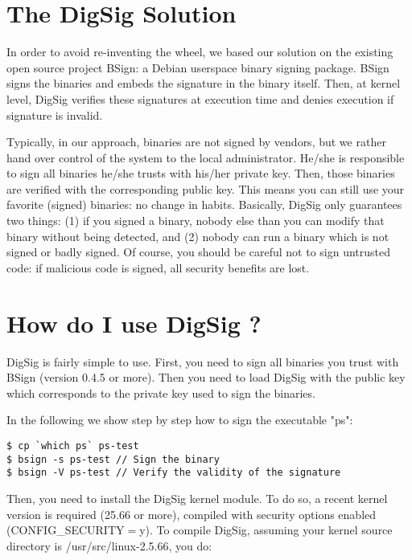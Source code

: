 \documentclass{article}
\begin{document}

\section{The DigSig Solution}

In order to avoid re-inventing the wheel, we based our solution on the
existing open source project BSign: a Debian userspace binary
signing package. BSign signs the binaries and embeds the signature in
the binary itself. Then, at kernel level, DigSig verifies these 
signatures at execution time and denies execution if signature is invalid. 

Typically, in our approach, binaries are not signed by vendors, but we
rather hand over control of the system to the local administrator.
He/she is responsible to sign all binaries he/she trusts with his/her
private key. Then, those binaries are verified with the corresponding
public key. This means you can still use your favorite (signed)
binaries: no change in habits. Basically, DigSig only guarantees two
things: (1) if you signed a binary, nobody else than you can modify
that binary without being detected, and (2) nobody can run a binary
which is not signed or badly signed.  Of course, you should be careful
not to sign untrusted code: if malicious code is signed, all security
benefits are lost.

\section{How do I use DigSig ?}
DigSig is fairly simple to use. First, you need to sign all binaries
you trust with BSign (version 0.4.5 or more). Then you need to load
DigSig with the public key which corresponds to the private key
used to sign the binaries.

In the following we show step by step how to sign the executable "ps":

\begin{verbatim} 
$ cp `which ps` ps-test
$ bsign -s ps-test // Sign the binary
$ bsign -V ps-test // Verify the validity of the signature 
\end{verbatim} 

Then, you need to install the DigSig kernel module. To do so, a recent
kernel version is required (25.66 or more), compiled with security
options enabled (CONFIG\_SECURITY$=$y).  To compile DigSig, assuming your
kernel source directory is /usr/src/linux-2.5.66, you do:
\end{document}
